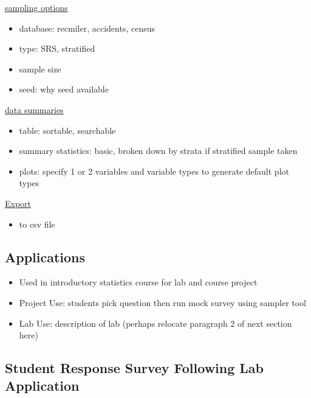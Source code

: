 \documentclass{article}\usepackage[]{graphicx}\usepackage[]{color}
\begin{document}
\underline{sampling options}
\begin{itemize}
\item database: recmiler, accidents, census
\item type: SRS, stratified
\item sample size
\item seed: why seed available
\end{itemize}

\vspace{.1in}

\underline{data summaries}
\begin{itemize}
\item table: sortable, searchable
\item summary statistics: basic, broken down by strata if stratified sample taken
\item plots: specify 1 or 2 variables and variable types to generate default plot types
\end{itemize}

\vspace{.1in}

\underline{Export}
\begin{itemize}
\item to csv file
\end{itemize}

\vspace{.1in}

\subsection{Applications}

\begin{itemize}
\item Used in introductory statistics course for lab and course project
\item Project Use: students pick question then run mock survey using sampler tool
\item Lab Use: description of lab (perhaps relocate paragraph 2 of next section here)
\end{itemize}

\subsection{Student Response Survey Following Lab Application}
\end{document}
